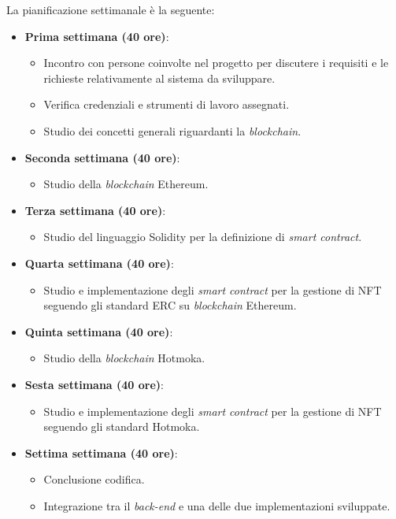 \noindent La pianificazione settimanale è la seguente: 
\begin{itemize}
  \item \textbf{Prima settimana (40 ore)}:
  \begin{itemize}
      \item Incontro con persone coinvolte nel progetto per discutere i requisiti e le richieste
      relativamente al sistema da sviluppare.
      \item Verifica credenziali e strumenti di lavoro assegnati.
      \item Studio dei concetti generali riguardanti la \textit{blockchain}.
  \end{itemize}
  \item \textbf{Seconda settimana (40 ore)}:
  \begin{itemize}
      \item Studio della \textit{blockchain} Ethereum.
  \end{itemize}
  \item \textbf{Terza settimana (40 ore)}:
  \begin{itemize}
      \item Studio del linguaggio Solidity per la definizione di \textit{smart contract}.
  \end{itemize}
  \item \textbf{Quarta settimana (40 ore)}:
  \begin{itemize}
      \item Studio e implementazione degli \textit{smart contract} per la gestione di NFT seguendo gli standard ERC su \textit{blockchain} Ethereum.
  \end{itemize}
  \item \textbf{Quinta settimana (40 ore)}:
  \begin{itemize}
      \item Studio della \textit{blockchain} Hotmoka.
  \end{itemize}
  \item \textbf{Sesta settimana (40 ore)}:
  \begin{itemize}
      \item Studio e implementazione degli \textit{smart contract} per la gestione di NFT seguendo gli standard Hotmoka.
  \end{itemize}
  \item \textbf{Settima settimana (40 ore)}:
  \begin{itemize}
      \item Conclusione codifica.
      \item Integrazione tra il \textit{back-end} e una delle due implementazioni sviluppate.

\end{itemize}
\end{itemize}
